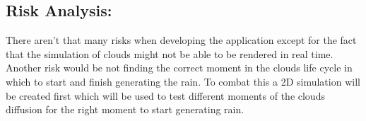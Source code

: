 \subsection{Risk Analysis:}
There aren't that many risks when developing the application except for the fact that the simulation of clouds might not be able to be rendered in real time.
Another risk would be not finding the correct moment in the clouds life cycle in which to start and finish generating the rain.
To combat this a 2D simulation will be created first which will be used to test different moments of the clouds diffusion for the right moment to start generating rain.  